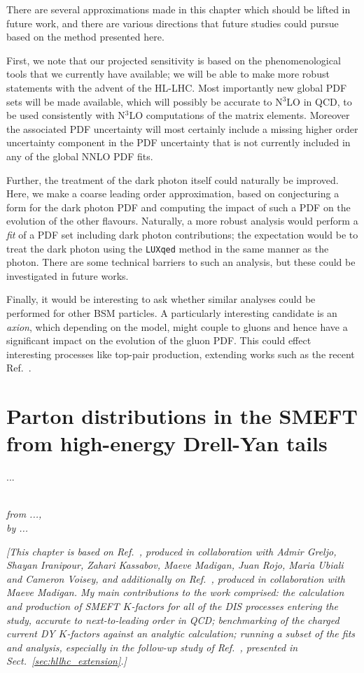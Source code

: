 \documentclass[withindex,glossary]{cam-thesis}
\begin{document}
There are several approximations made in this chapter which should be lifted in future work, and there are various directions that future studies could pursue based on the method presented here.

First, we note that our projected sensitivity is based on the phenomenological tools that we currently have available; we will be able to make more robust statements with the advent of the HL-LHC. Most importantly new global PDF sets will be made available, which will possibly be accurate to N$^3$LO in QCD, to be used consistently with N$^3$LO computations of the matrix elements. Moreover the associated PDF uncertainty will most certainly include a missing higher order uncertainty component in the PDF uncertainty that is not currently included in any of the global NNLO PDF fits.

Further, the treatment of the dark photon itself could naturally be improved. Here, we make a coarse leading order approximation, based on conjecturing a form for the dark photon PDF and computing the impact of such a PDF on the evolution of the other flavours. Naturally, a more robust analysis would perform a \textit{fit} of a PDF set including dark photon contributions; the expectation would be to treat the dark photon using the \texttt{LUXqed} method in the same manner as the photon. There are some technical barriers to such an analysis, but these could be investigated in future works.

Finally, it would be interesting to ask whether similar analyses could be performed for other BSM particles. A particularly interesting candidate is an \textit{axion}, which depending on the model, might couple to gluons and hence have a significant impact on the evolution of the gluon PDF. This could effect interesting processes like top-pair production, extending works such as the recent Ref.~\cite{Esser:2023fdo}. 


 


\newpage
\chapter{Parton distributions in the SMEFT from high-energy Drell-Yan tails}
\label{chap:smeftdy}

\epigraph{...}{\textit{\\ from ..., \\ by ...}}

\noindent \textit{[This chapter is based on Ref.~\cite{Greljo:2021kvv}, produced in collaboration with Admir Greljo, Shayan Iranipour, Zahari Kassabov, Maeve Madigan, Juan Rojo, Maria Ubiali and Cameron Voisey, and additionally on Ref.~\cite{Madigan:2021uho}, produced in collaboration with Maeve Madigan. My main contributions to the work comprised: the calculation and production of SMEFT $K$-factors for all of the DIS processes entering the study, accurate to next-to-leading order in QCD; benchmarking of the charged current DY $K$-factors against an analytic calculation; running a subset of the fits and analysis, especially in the follow-up study of Ref.~\cite{Madigan:2021uho}, presented in Sect.~\ref{sec:hllhc_extension}.]}\\
\end{document}
